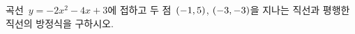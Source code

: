 곡선~$y=-2x^2-4x+3$에 접하고 두 점~$(-1{,}\mkern3mu\mathopen{}5)$, $(-3{,}\mkern3mu\mathopen{}-3)$을 지나는 직선과 평행한 직선의 방정식을 구하시오.
